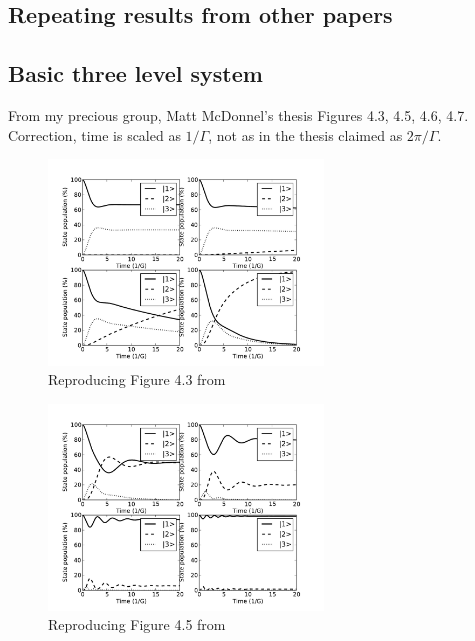 \documentclass{article}
\begin{document}
\begin{spacing}{1.1}
\section{Repeating results from other papers}

\subsection{Basic three level system}
From my precious group, Matt McDonnel's thesis \cite{McDonnell2003}
Figures 4.3, 4.5, 4.6, 4.7. Correction, time is scaled as $1/\Gamma$, not as in the thesis claimed as $2\pi/\Gamma$.

\begin{figure}
\begin{center}
\includegraphics[width=0.65\textwidth]{figures/matt43.pdf}
\caption{Reproducing Figure 4.3 from \cite{McDonnell2003}}
\label{fig:matt43}
\end{center}
\end{figure}

\begin{figure}
\begin{center}
\includegraphics[width=0.65\textwidth]{figures/matt45.pdf}
\caption{Reproducing Figure 4.5 from \cite{McDonnell2003}}
\label{fig:matt43}
\end{center}
\end{figure}


\end{spacing}
\end{document}
